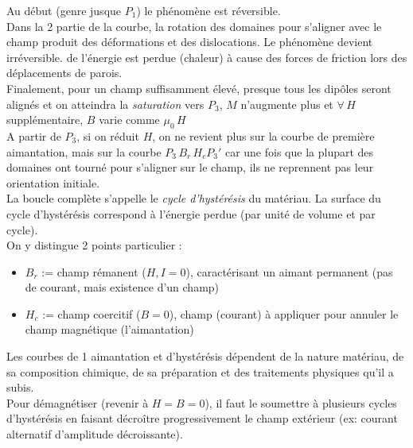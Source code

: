 \documentclass[british,french,11pt, a4paper, openany]{book}
\begin{document}
		Au début (genre jusque $P_1$) le phénomène est réversible.\\
		Dans la 2 partie de la courbe, la rotation des domaines pour s'aligner avec le champ produit des déformations et des dislocations. Le phénomène  devient irréversible. de l'énergie est perdue (chaleur) à cause des forces de friction lors des déplacements de parois.\\
		
		Finalement, pour un champ suffisamment élevé, presque tous les dipôles seront alignés et on atteindra la \textit{saturation} vers $P_3$, $M$ n'augmente plus et $\forall\, H$ supplémentaire, $B$ varie comme $\mu_0\,H$\\
		
		A partir de $P_3$, si on réduit $H$, on ne revient plus sur la courbe de première aimantation, mais sur la courbe $P_3\,B_r\,H_c P_3'$ car une fois que la plupart des domaines ont tourné pour s'aligner sur le champ, ils ne reprennent pas leur orientation initiale.\\
		
		La boucle complète s'appelle le \textit{cycle d'hystérésis} du matériau. La surface du cycle d'hystérésis correspond à l'énergie perdue (par unité de volume et par cycle).\\
		On y distingue 2 points particulier :\begin{itemize}
			\item $B_r$ := champ rémanent ($H,I=0$), caractérisant un aimant permanent (pas de courant, mais existence d'un champ)
			\item $H_c$ := champ coercitif ($B=0$), champ (courant) à appliquer pour annuler le champ magnétique (l'aimantation)
		\end{itemize}
		Les courbes de 1 aimantation et d'hystérésis dépendent de la nature matériau, de sa composition chimique, de sa préparation et des traitements physiques qu'il a subis.\\
		
		Pour démagnétiser (revenir à $H=B=0$), il faut le soumettre à plusieurs cycles d'hystérésis en faisant décroître progressivement le champ extérieur (ex: courant alternatif d'amplitude décroissante).
		
\end{document}

